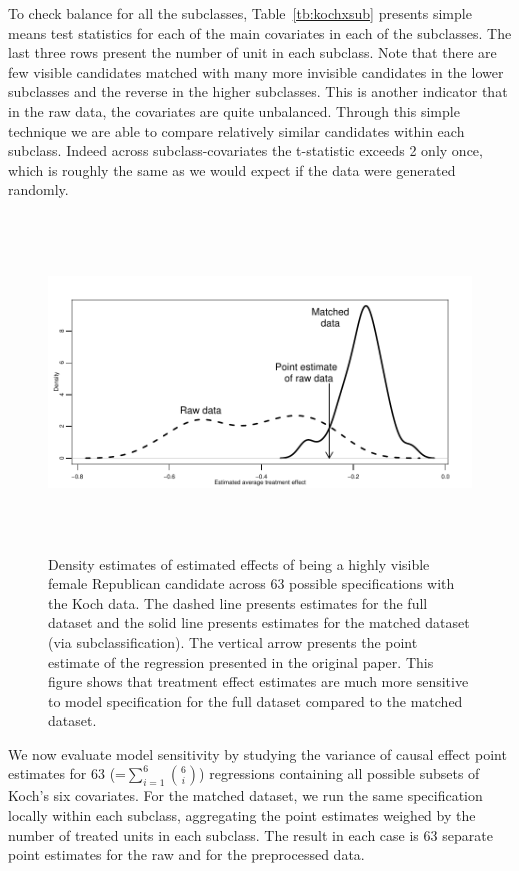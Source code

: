 \documentclass[11pt,titlepage]{article}
\begin{document}
To check balance for all the subclasses, Table~\ref{tb:kochxsub}
presents simple means test statistics for each of the main covariates
in each of the subclasses.  The last three rows present the number of
unit in each subclass.  Note that there are few visible candidates
matched with many more invisible candidates in the lower subclasses
and the reverse in the higher subclasses.  This is another indicator
that in the raw data, the covariates are quite unbalanced.  Through
this simple technique we are able to compare relatively similar
candidates within each subclass.  Indeed across subclass-covariates
the t-statistic exceeds 2 only once, which is roughly the same as we
would expect if the data were generated randomly.
\begin{figure}[t] 
 \begin{center}
    \includegraphics[height=3.5in,angle=0]{figs/kochdens.pdf}
  \end{center}
  \vspace{-0.275in}
  \caption{Density estimates of estimated effects of being
    a highly visible female Republican candidate across 63 possible
    specifications with the Koch data.  The dashed line presents
    estimates for the full dataset and the solid line presents
    estimates for the matched dataset (via subclassification).  The
    vertical arrow presents the point estimate of the regression
    presented in the original paper.  This figure shows that treatment
    effect estimates are much more sensitive to model specification
    for the full dataset compared to the matched dataset.}
  \label{fg:kochdens}
\end{figure}

We now evaluate model sensitivity by studying the variance of causal
effect point estimates for 63 (=$\sum_{i=1}^6 {6 \choose i}$)
regressions containing all possible subsets of Koch's six covariates.
For the matched dataset, we run the same specification locally within
each subclass, aggregating the point estimates weighed by the number
of treated units in each subclass.  The result in each case is 63
separate point estimates for the raw and for the preprocessed data.
\end{document}
